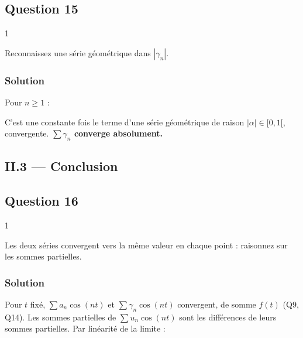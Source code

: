 \documentclass[11pt,a4paper]{article}
\newcommand{\equationajustee}[1]{%
  \sbox{\boiteequation}{$\displaystyle #1$}%
  \ifdim\wd\boiteequation>\linewidth
    \[\resizebox{\linewidth}{!}{\usebox{\boiteequation}}\]%
  \else
    \[#1\]%
  \fi}
\begin{document}
\hypertarget{question-15}{%
\subsection{Question 15}\label{question-15}}

\begin{indication}{1}

Reconnaissez une série géométrique dans \(|\gamma_n|\).

\end{indication}

\hypertarget{solution-14}{%
\subsubsection{Solution}\label{solution-14}}

Pour \(n\ge1\) :

\equationajustee{|\gamma_n|=\frac{4|\alpha|}{1-\alpha^2}|\alpha|^n.}

C'est une constante fois le terme d'une série géométrique de raison \(|\alpha|\in[0,1[\), convergente. \textbf{\(\sum\gamma_n\) converge absolument.}

\hypertarget{ii.3-conclusion}{%
\subsection{II.3 --- Conclusion}\label{ii.3-conclusion}}

\hypertarget{question-16}{%
\subsection{Question 16}\label{question-16}}

\begin{indication}{1}

Les deux séries convergent vers la même valeur en chaque point : raisonnez sur les sommes partielles.

\end{indication}

\hypertarget{solution-15}{%
\subsubsection{Solution}\label{solution-15}}

Pour \(t\) fixé, \(\sum a_n\cos(nt)\) et \(\sum\gamma_n\cos(nt)\) convergent, de somme \(f(t)\) (Q9, Q14). Les sommes partielles de \(\sum u_n\cos(nt)\) sont les différences de leurs sommes partielles. Par linéarité de la limite :
\end{document}
